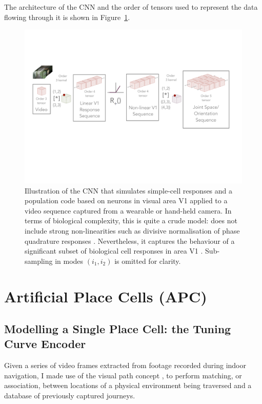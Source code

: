 The architecture of the CNN and the order of tensors used to represent the data flowing through it is shown in Figure~\ref{fig:arch}.

\begin{figure}
\centering
\includegraphics[width=1.1\linewidth,trim={0 7cm 0 3cm},clip]{gfx/Chapter05/video_encoding_pipeline.pdf}
\caption{Illustration of the CNN that simulates simple-cell responses and a population code based on neurons in visual area V1 applied to a video sequence captured from a wearable or hand-held camera.  In terms of biological complexity, this is quite a crude model: does not include strong non-linearities such as divisive normalisation of phase quadrature
responses \cite{petrou2008next}. Nevertheless, it captures the behaviour of a significant subset of biological cell responses in area V1 \cite{carandini1997predictions}. Sub-sampling in modes $(i_1,i_2)$ is omitted for clarity.}
\label{fig:arch}
\end{figure}

\section{Artificial Place Cells (APC)}

\subsection{Modelling a Single Place Cell: the Tuning Curve Encoder}

Given a series of video frames extracted from footage recorded during indoor navigation, I made use of the visual path concept \cite{RiveraWearable, matsumoto1996visual, ohno1996autonomous}, to perform  matching, or association, between locations of a physical environment being traversed and a database of previously captured journeys.

